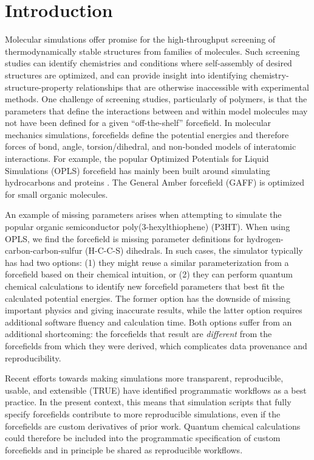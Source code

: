 \section{Introduction}
Molecular simulations offer promise for the high-throughput screening of thermodynamically stable structures from families of molecules.
Such screening studies can identify chemistries and conditions where self-assembly of desired structures are optimized, and can provide insight into identifying chemistry-structure-property relationships that are otherwise inaccessible with experimental methods\cite{daglar_opportunities_2020,liu2018molecular,lin2020review,afzal2020high,meier2004combinatorial,quach2022high}.
One challenge of screening studies, particularly of polymers, is that the parameters that define the interactions between and within model molecules may not have been defined for a given ``off-the-shelf'' forcefield\cite{wang_end--end_2022}. 
In molecular mechanics simulations, forcefields define the potential energies and therefore forces of bond, angle, torsion/dihedral, and non-bonded models of interatomic interactions\cite{hopfinger1984molecular,vanommeslaeghe2014molecular}. 
For example, the popular Optimized Potentials for Liquid Simulations (OPLS) forcefield has mainly been built around simulating hydrocarbons and proteins \citep{opls,ghahremanpour_refinement_2022}.
The General Amber forcefield (GAFF) is optimized for small organic molecules\cite{wang2004development}.

An example of missing parameters arises when attempting to simulate the popular organic semiconductor poly(3-hexylthiophene) (P3HT).
When using OPLS, we find the forcefield is missing parameter definitions for hydrogen-carbon-carbon-sulfur (H-C-C-S) dihedrals. 
In such cases, the simulator typically has had two options: (1) they might reuse a similar parameterization from a forcefield based on their chemical intuition, or (2) they can perform quantum chemical calculations to identify new forcefield parameters\cite{hopfinger1984molecular} that best fit the calculated potential energies.
The former option has the downside of missing important physics and giving inaccurate results, while the latter option requires additional software fluency and calculation time\cite{wang_end--end_2022}.
Both options suffer from an additional shortcoming: the forcefields that result are \textit{different} from the forcefields from which they were derived, which complicates data provenance and reproducibility.

Recent efforts towards making simulations more transparent, reproducible, usable, and extensible (TRUE)\cite{thompson2020towards,jankowski2020perspective} have identified programmatic workflows as a best practice.
In the present context, this means that simulation scripts that fully specify forcefields contribute to more reproducible simulations, even if the forcefields are custom derivatives of prior work\cite{Klein_foyer}.
Quantum chemical calculations could therefore be included into the programmatic specification of custom forcefields and in principle be shared as reproducible workflows.

